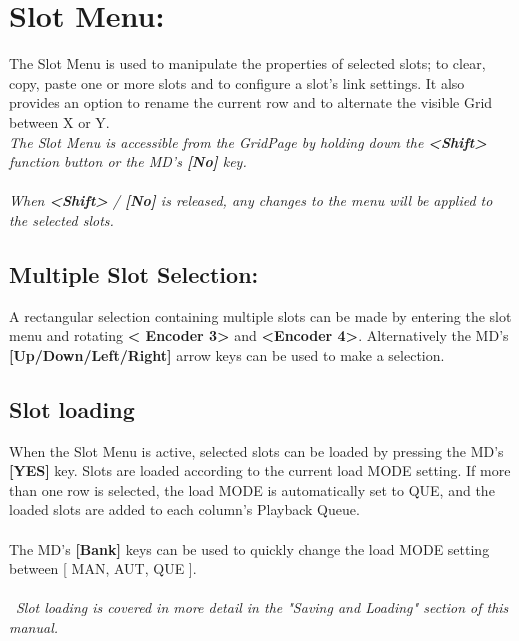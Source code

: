 \chapter{Slot Menu:}

The Slot Menu is used to manipulate the properties of selected slots; to clear, copy, paste one or more slots and to configure a slot's link settings. It also provides an option to rename the current row and to alternate the visible Grid between X or Y.
\\
\textit{The Slot Menu is accessible from the GridPage by holding down the \textbf{<Shift>} function button or the MD's \textbf{[No]} key.\\\\When \textbf{<Shift>} / \textbf{[No]} is released, any changes to the menu will be applied to the selected slots. }
\section{Multiple Slot Selection:}
A rectangular selection containing multiple slots can be made by entering the slot menu and rotating \textbf{< Encoder 3>} and \textbf{<Encoder 4>}. Alternatively the MD's \textbf{[Up/Down/Left/Right]} arrow keys can be used to make a selection.
\section{Slot loading}
When the Slot Menu is active, selected slots can be loaded by pressing the MD's \textbf{[YES]} key. 
Slots are loaded according to the current load MODE setting. If more than one row is selected, the load MODE is automatically set to QUE, and the loaded slots are added to each column's Playback Queue.
\\\\
The MD's \textbf{[Bank]} keys can be used to quickly change the load MODE setting between [ MAN, AUT, QUE ].
\\\\\
\textit{Slot loading is covered in more detail in the "Saving and Loading" section of this manual.}
\newpage
